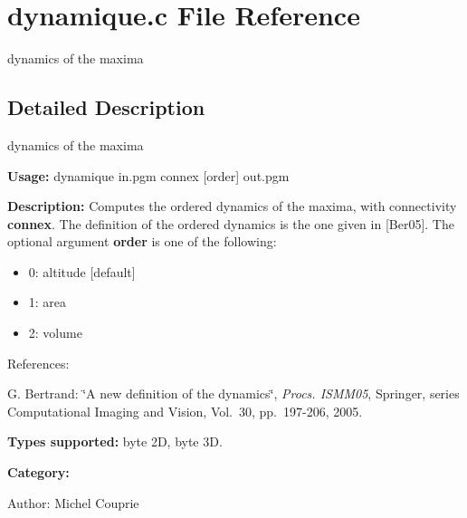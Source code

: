 \section{dynamique.c File Reference}
\label{dynamique_8c}
dynamics of the maxima  




\label{_details}
\subsection{Detailed Description}
dynamics of the maxima 

{\bf Usage:} dynamique in.pgm connex [order] out.pgm

{\bf Description:} Computes the ordered dynamics of the maxima, with connectivity {\bf connex}. The definition of the ordered dynamics is the one given in [Ber05]. The optional argument {\bf order} is one of the following: \begin{itemize}
\item 0: altitude [default] \item 1: area \item 2: volume\end{itemize}
References:\par
 [Ber05] G. Bertrand: \char`\"{}A new definition of the dynamics\char`\"{}, {\em Procs. ISMM05\/}, Springer, series Computational Imaging and Vision, Vol.~30, pp.~197-206, 2005.\par


{\bf Types supported:} byte 2D, byte 3D.

{\bf Category:}

\begin{Desc}
\item[Author:]Michel Couprie \end{Desc}
